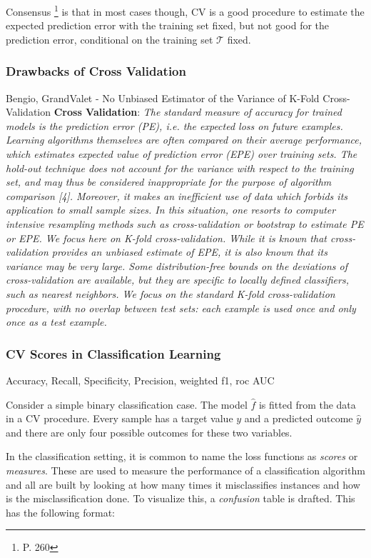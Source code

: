 Consensus \footnote{\cite{hastie-elemstatslearn} P. 260} is that in most cases though, CV is a good procedure to estimate the expected prediction error with the training set fixed, but not good for the prediction error, conditional on the training set $\mathcal{T}$ fixed.

 \subsubsection{Drawbacks of Cross Validation}
 
 Bengio, GrandValet - No Unbiased Estimator of the Variance of K-Fold Cross-Validation
 \textbf{Cross Validation}: 
 \textit{The standard measure of accuracy for trained models is the prediction error (PE), i.e. the expected loss on future examples. Learning algorithms themselves are often compared on their average performance, which estimates expected value of prediction error (EPE) over training sets.
 	The hold-out technique does not account for the variance with respect to the training set, and may thus be considered inappropriate for the purpose of algorithm comparison [4]. Moreover, it makes an inefficient use of data which forbids its application to small sample sizes. In this situation, one resorts to computer intensive resampling methods such as cross-validation or bootstrap to estimate PE or EPE. We focus here on K-fold cross-validation. While it is known that cross-validation provides an unbiased estimate of EPE, it is also known that its variance may be very large.
 	Some distribution-free bounds on the deviations of cross-validation are available, but they are specific to locally defined classifiers, such as nearest neighbors.
 	We focus on the standard K-fold cross-validation procedure, with no overlap between test sets: each example is used once and only once as a test example.
 }

\subsubsection{CV Scores in Classification Learning}
Accuracy, Recall, Specificity, Precision,  weighted f1, roc AUC

Consider a simple binary classification case. The model $\hat{f}$ is fitted from the data in a CV procedure. Every sample has a target value $y$ and a predicted outcome $\hat{y}$ and there are only four possible outcomes for these two variables.  

In the classification setting, it is common to name the loss functions as \textit{scores} or \textit{measures}. These are used to measure the performance of a classification algorithm and all are built by looking at how many times it misclassifies instances and how is the misclassification done. To visualize this, a \textit{confusion} table is drafted. This has the following format:

